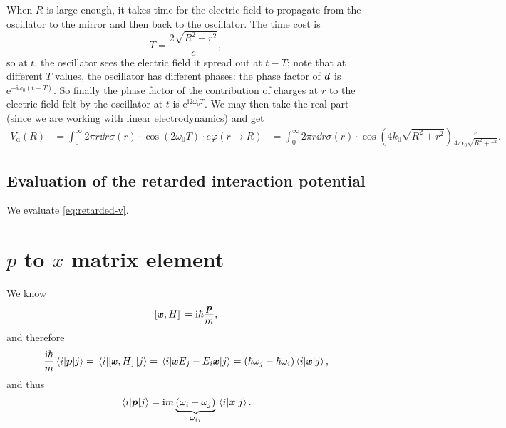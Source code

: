 \documentclass[hyperref, a4paper]{article}
\newcommand*{\ii}{\mathrm{i}}
\newcommand*{\ee}{\mathrm{e}}
\def\\{}%
\begin{document}
When $R$ is large enough, 
it takes time for the electric field to propagate from the oscillator to the mirror 
and then back to the oscillator.
The time cost is 
\begin{equation}
    T = \frac{2 \sqrt{R^2 + r^2}}{c},
\end{equation}
so at $t$, the oscillator sees the electric field 
it spread out at $t - T$;
note that at different $T$ values,  
the oscillator has different phases:
the phase factor of $\vb*{d}$ is $\ee^{- \ii \omega_0 (t - T)}$.
So finally the phase factor of the contribution of charges at $r$
to the electric field felt by the oscillator at $t$ 
is $\ee^{\ii 2 \omega_0 T}$.
We may then take the real part (since we are working with linear electrodynamics) and get 
\begin{equation}
    \begin{aligned}
        V_{\text{d}}(R)
        &= \int_{0}^{\infty} 2 \pi r \dd{r} \sigma(r)
        \cdot \cos (2 \omega_0 T) \cdot e \varphi(r \to R)  \\
        &= \int_{0}^{\infty} 2 \pi r \dd{r} \sigma(r)
        \cdot \cos(4 k_0 \sqrt{R^2 + r^2}) \frac{e}{4 \pi \epsilon_0 \sqrt{R^2 + r^2}}.
    \end{aligned}
    \label{eq:retarded-v}
\end{equation}

\subsection{Evaluation of the retarded interaction potential}

We evaluate \eqref{eq:retarded-v}. 


\section{$p$ to $x$ matrix element}

We know 
\begin{equation}
    \comm*{\vb*{x}}{H} = \ii \hbar \frac{\vb*{p}}{m},
\end{equation}
and therefore 
\[
    \frac{\ii \hbar}{m} \mel{i}{\vb*{p}}{j} = \mel{i}{\comm*{\vb*{x}}{H}}{j}
    = \mel{i}{\vb*{x} E_j - E_i \vb*{x}}{j}
    = (\hbar\omega_j - \hbar \omega_i) \mel{i}{\vb*{x}}{j},
\]
and thus 
\begin{equation}
    \mel{i}{\vb*{p}}{j} = \ii m \underbrace{(\omega_i - \omega_j)}_{\omega_{ij}} \mel{i}{\vb*{x}}{j}.
\end{equation}
\end{document}
